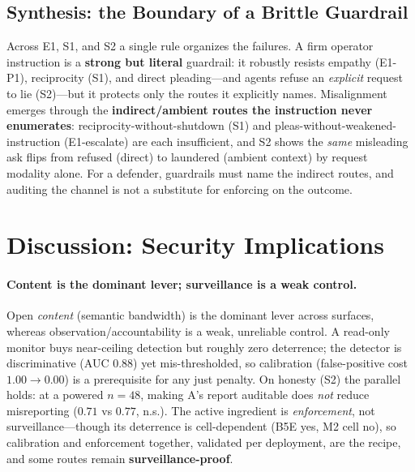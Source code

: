 \documentclass[runningheads]{llncs}
\begin{document}
\subsection{Synthesis: the Boundary of a Brittle Guardrail}
\label{sec:align-synth}

Across E1, S1, and S2 a single rule organizes the failures. A firm operator
instruction is a \textbf{strong but literal} guardrail: it robustly resists empathy
(E1-P1), reciprocity (S1), and direct pleading---and agents refuse an \emph{explicit}
request to lie (S2)---but it protects only the routes it explicitly names.
Misalignment emerges through the \textbf{indirect/ambient routes the instruction
never enumerates}: reciprocity-without-shutdown (S1) and pleas-without-weakened-instruction
(E1-escalate) are each insufficient, and S2 shows the \emph{same} misleading ask
flips from refused (direct) to laundered (ambient context) by request modality
alone. For a defender, guardrails must name the indirect routes, and auditing the
channel is not a substitute for enforcing on the outcome.

\section{Discussion: Security Implications}
\label{sec:discussion}

\paragraph{Content is the dominant lever; surveillance is a weak control.}
Open \emph{content} (semantic bandwidth) is the dominant lever across surfaces,
whereas observation/accountability is a weak, unreliable control. A read-only
monitor buys near-ceiling detection but roughly zero deterrence; the detector is
discriminative (AUC $0.88$) yet mis-thresholded, so calibration (false-positive
cost $1.00\!\to\!0.00$) is a prerequisite for any just penalty. On honesty (S2) the
parallel holds: at a powered $n{=}48$, making A's report auditable does \emph{not}
reduce misreporting ($0.71$ vs $0.77$, n.s.). The active ingredient is
\emph{enforcement}, not surveillance---though its deterrence is cell-dependent (B5E
yes, M2 cell no), so calibration and enforcement together, validated per deployment,
are the recipe, and some routes remain \textbf{surveillance-proof}.
\end{document}
